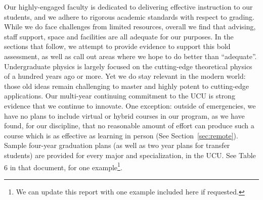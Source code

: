 \documentclass[12pt]{article}
\begin{document}

\noindent
Our highly-engaged faculty is dedicated to delivering effective
instruction to our students, and we adhere to rigorous academic
standards with respect to grading.  While we do face challenges from
limited resources, overall we find that advising, staff support, space
and facilities are all adequate for our purposes.  In the sections
that follow, we attempt to provide evidence to support this bold
assessment, as well as call out areas where we hope to do better than
``adequate''.  Undergraduate physics is largely focused on the
cutting-edge theoretical physics of a hundred years ago or more.  Yet
we do stay relevant in the modern world: those old ideas remain
challenging to master and highly potent to cutting-edge applications.
Our multi-year continuing commitment to the UCU is strong evidence
that we continue to innovate.  One exception: outside of emergencies,
we have no plans to include virtual or hybrid courses in our program,
as we have found, for our discipline, that no reasonable amount of
effort can produce such a course which is as effective as learning in
person (See Section~\ref{sec:remote}).  Sample four-year graduation
plans (as well as two year plans for transfer students) are provided
for every major and specialization, in the UCU.  See Table 6 in that
document, for one example\footnote{We can update this report with one
  example included here if requested.}.\\[3pt]
\end{document}
